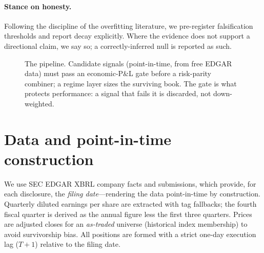 \documentclass[11pt,a4paper]{article}
\theoremstyle{plain}
\theoremstyle{definition}
\begin{document}
\paragraph{Stance on honesty.} Following the discipline of the overfitting literature, we
pre-register falsification thresholds and report decay explicitly. Where the evidence does not
support a directional claim, we say so; a correctly-inferred null is reported as such.

\begin{figure}[h]
\centering
{}
\caption{The pipeline. Candidate signals (point-in-time, from free EDGAR data) must pass an
economic-P\&L gate before a risk-parity combiner; a regime layer sizes the surviving book. The gate
is what protects performance: a signal that fails it is discarded, not down-weighted.}
\label{fig:pipeline}
\end{figure}

\section{Data and point-in-time construction}
\label{sec:data}

We use SEC EDGAR XBRL company facts and submissions, which provide, for each disclosure, the
\emph{filing date}---rendering the data point-in-time by construction. Quarterly diluted earnings
per share are extracted with tag fallbacks; the fourth fiscal quarter is derived as the annual
figure less the first three quarters. Prices are adjusted closes for an \emph{as-traded} universe
(historical index membership) to avoid survivorship bias. All positions are formed with a strict
one-day execution lag ($T{+}1$) relative to the filing date.
\end{document}
